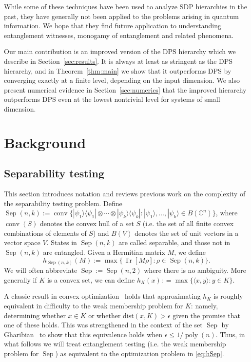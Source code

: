 \documentclass[aps,pra,notitlepage,preprintnumbers,11pt,tightenlines]{revtex4-1}
\newcommand{\bra}[1]{\langle #1 |}
\newcommand{\ket}[1]{| #1 \rangle}
\newcommand{\eps}{\epsilon}
\newcommand{\bbC}{\mathbb{C}}
\newcommand{\ot}{\otimes}
\newcommand{\be}{\begin{equation}}
\newcommand{\ee}{\end{equation}}
\newcommand{\proj}[1]{\ket{#1} \bra{#1}}
\DeclareMathOperator{\Sep}{Sep}
\DeclareMathOperator{\Tr}{Tr}
\DeclareMathOperator{\poly}{poly}
\DeclareMathOperator{\conv}{conv}
\begin{document}
While some of these techniques have been used to analyze SDP
hierarchies in the past, they have generally not been applied to the
problems arising in quantum information.  We hope that they find
future application to understanding entanglement witnesses, monogamy
of entanglement and related phenomena.


Our main contribution is an improved version of the DPS hierarchy
which we describe in Section~\ref{sec:results}.   It is always at
least as stringent as the DPS hierarchy, and in Theorem~\ref{thm:main}
we show that it outperforms DPS by converging exactly at a finite
level, depending on the input dimension. We also present numerical
evidence in Section~\ref{sec:numerics} that the improved hierarchy outperforms DPS even at the
lowest nontrivial level for systems of small dimension.
\section{Background}\label{sec:background}
\subsection{Separability testing}
This section introduces notation and reviews previous work on the complexity of the separability testing
problem.  Define $\Sep(n,k) := \conv \{\proj{\psi_1} \ot \cdots \ot
\proj{\psi_k} : \ket{\psi_1},\ldots,\ket{\psi_k} \in B(\bbC^n)\}$,
where $\conv(S)$ denotes the convex hull of a set $S$ (i.e. the set of
all finite convex combinations of elements of $S$) and $B(V)$ denotes
the set of unit vectors in a vector space $V$.  States in $\Sep(n,k)$
are called separable, and those not in $\Sep(n,k)$ are entangled.
Given a Hermitian matrix
$M$, we define
\be h_{\Sep(n,k)}(M) := \max\{ \Tr[M\rho] : \rho\in \Sep(n,k)\}.
\label{eq:hSep}\ee
We will often abbreviate
$\Sep := \Sep(n,2)$ where there is no ambiguity.
More generally if $K$ is a convex set, we can define $h_K(x) :
=\max\{\langle x,y\rangle : y \in K \}$.  

A classic result in convex optimization~\cite{gls:1993} holds that
approximating $h_K$ is roughly equivalent in difficulty to the weak
membership problem for $K$: namely, determining whether $x\in K$ or
whether $\text{dist}(x,K)>\eps$ given the promise that one of these
holds.  This was strengthened in the context of the set $\Sep$ by
Gharibian~\cite{gharibian10} to show that this equivalence holds when
$\eps \leq 1/\poly(n)$.  Thus, in what follows we will treat
entanglement testing (i.e. the weak membership problem for $\Sep$) as
equivalent to the optimization problem in \eqref{eq:hSep}.
\end{document}
